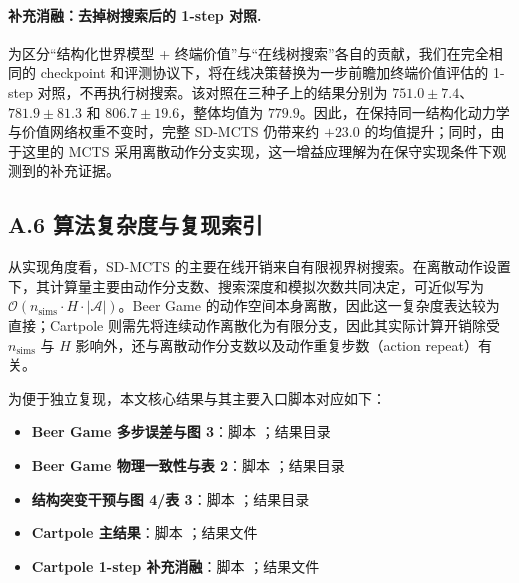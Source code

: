 \documentclass[UTF8]{ctexart}
\let\oldparagraph\paragraph
\renewcommand{\paragraph}[1]{\oldparagraph{#1}\mbox{}}
\begin{document}
\paragraph{补充消融：去掉树搜索后的 1-step 对照.}
为区分“结构化世界模型 + 终端价值”与“在线树搜索”各自的贡献，我们在完全相同的 checkpoint 和评测协议下，将在线决策替换为一步前瞻加终端价值评估的 1-step 对照，不再执行树搜索。该对照在三种子上的结果分别为 \(751.0\pm7.4\)、\(781.9\pm81.3\) 和 \(806.7\pm19.6\)，整体均值为 \(779.9\)。因此，在保持同一结构化动力学与价值网络权重不变时，完整 SD-MCTS 仍带来约 \(+23.0\) 的均值提升；同时，由于这里的 MCTS 采用离散动作分支实现，这一增益应理解为在保守实现条件下观测到的补充证据。

\hypertarget{a.6-complexity-and-reproducibility-index}{%
\subsection{A.6 算法复杂度与复现索引}\label{a.6-complexity-and-reproducibility-index}}

从实现角度看，SD-MCTS 的主要在线开销来自有限视界树搜索。在离散动作设置下，其计算量主要由动作分支数、搜索深度和模拟次数共同决定，可近似写为 \(\mathcal{O}(n_{\text{sims}} \cdot H \cdot |\mathcal{A}|)\)。Beer Game 的动作空间本身离散，因此这一复杂度表达较为直接；Cartpole 则需先将连续动作离散化为有限分支，因此其实际计算开销除受 \(n_{\text{sims}}\) 与 \(H\) 影响外，还与离散动作分支数以及动作重复步数（action repeat）有关。

为便于独立复现，本文核心结果与其主要入口脚本对应如下：
\begin{itemize}
\item \textbf{Beer Game 多步误差与图 3}：脚本 ；结果目录 
\item \textbf{Beer Game 物理一致性与表 2}：脚本 ；结果目录 
\item \textbf{结构突变干预与图 4/表 3}：脚本 ；结果目录 
\item \textbf{Cartpole 主结果}：脚本 ；结果文件 
\item \textbf{Cartpole 1-step 补充消融}：脚本 ；结果文件 
\end{itemize}
\end{document}
